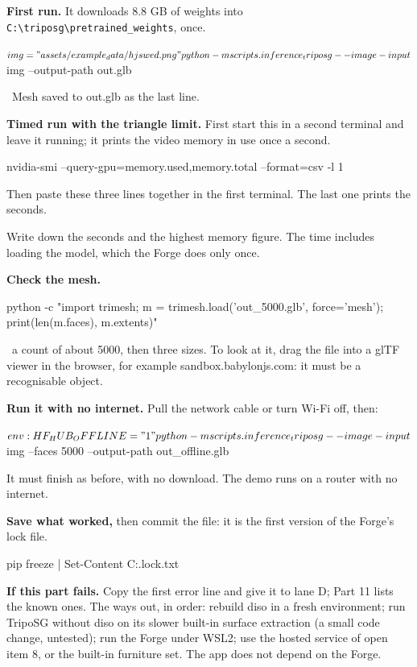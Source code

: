 \documentclass[10pt]{article}
\newcommand{\cc}{\lstinline[style=inl]}
\newcommand{\code}[1]{{\ttfamily\fontsize{8.8}{11}\selectfont #1}}
\newcommand{\see}{\par\vspace{0.6mm}{\footnotesize\color{mute}You should see:}}
\newcommand{\act}[1]{\textbf{#1}\enskip}
\newcommand{\step}{\needspace{21mm}\item}
\newenvironment{trap}[1][If it fails]{\par\vspace{1.4mm}\begin{lrbox}{\notebox}%
  \begin{minipage}{\dimexpr\linewidth-5mm\relax}\small\raggedright{\bfseries\color{accC}#1}\enskip}
  {\end{minipage}\end{lrbox}{\setlength{\fboxsep}{2.5mm}\colorbox{trapbg}{\usebox{\notebox}}}\par\vspace{1.4mm}}
\begin{document}
\begin{steps}
\step \act{First run.} It downloads 8.8 GB of weights into \cc!C:\triposg\pretrained_weights!, once.
\begin{cmd}
$img = "assets/example_data/hjswed.png"
python -m scripts.inference_triposg --image-input $img --output-path out.glb
\end{cmd}
      \see\ \code{Mesh saved to out.glb} as the last line.

\step \act{Timed run with the triangle limit.} First start this in a second terminal and leave it running; it prints the
      video memory in use once a second.
\begin{cmd}
nvidia-smi --query-gpu=memory.used,memory.total --format=csv -l 1
\end{cmd}
      Then paste these three lines together in the first terminal. The last one prints the seconds.
      Write down the seconds and the highest memory figure. The time includes loading the model, which the Forge does only once.

\step \act{Check the mesh.}
\begin{cmd}
python -c "import trimesh; m = trimesh.load('out_5000.glb', force='mesh'); print(len(m.faces), m.extents)"
\end{cmd}
      \see\ a count of about 5000, then three sizes. To look at it, drag the file into a glTF viewer in the browser, for
      example \code{sandbox.babylonjs.com}: it must be a recognisable object.

\step \act{Run it with no internet.} Pull the network cable or turn Wi-Fi off, then:
\begin{cmd}
$env:HF_HUB_OFFLINE = "1"
python -m scripts.inference_triposg --image-input $img --faces 5000 --output-path out_offline.glb
\end{cmd}
      It must finish as before, with no download. The demo runs on a router with no internet.

\step \act{Save what worked,} then commit the file: it is the first version of the Forge's lock file.
\begin{cmd}
pip freeze | Set-Content C:\atlas\station\forge\requirements.lock.txt
\end{cmd}
\end{steps}
\begin{trap}[If this part fails.]
Copy the first error line and give it to lane D; Part 11 lists the known ones. The ways out, in order: rebuild
\code{diso} in a fresh environment; run TripoSG without \code{diso} on its slower built-in surface extraction (a small
code change, untested); run the Forge under WSL2; use the hosted service of open item 8, or the built-in furniture set.
The app does not depend on the Forge.
\end{trap}
\end{document}
